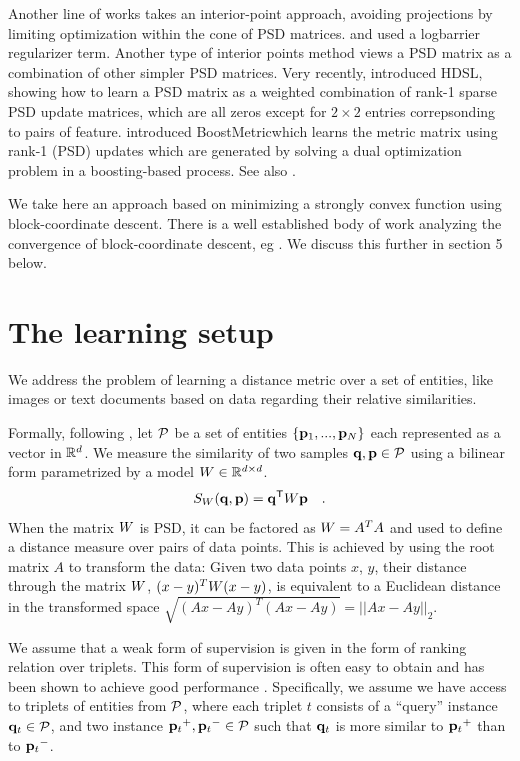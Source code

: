 \documentclass{article}
\begin{document}
Another line of works takes an interior-point approach, avoiding projections by limiting optimization within the cone of PSD matrices. \citet{davis2007information} and \citet{lego} used a logbarrier regularizer term. 
Another type of interior points method views a PSD matrix as a combination of other simpler PSD matrices. Very recently, \citet{hdsl} introduced HDSL, showing how to learn a PSD matrix as a weighted combination of rank-1 sparse PSD update matrices, which are all zeros except for $2\times2$ entries correpsonding to pairs of feature. \citet{boost} introduced BoostMetricwhich learns the metric matrix using rank-1 (PSD) updates which are generated by solving a dual optimization problem in a boosting-based process. See also \cite{bi2011adaboost}.

We take here an approach based on minimizing a strongly convex function using block-coordinate descent. There is a well established body of work analyzing the convergence of block-coordinate descent, eg \cite{nesterov2012efficiency,richtarik2014iteration}. We discuss this further in section 5 below.


\section{The learning setup}
We address the problem of learning a distance metric over a set of
entities, like images or text documents based on data regarding their
relative similarities.

Formally, following \cite{OASIS}, let $\cal{P}$ be a set of entities
$\{{\mathbf{p}}_1,...,{\mathbf{p}}_N\}$ each represented as a vector in $\mathbb{R}^d$.  We measure
the similarity of two samples ${\mathbf{q}}, {\mathbf{p}} \in \cal{P}$ using a bilinear
form parametrized by a model ${W} \in \mathbb{R}^{d \times d}$.
\begin{equation}
  S_{{W}}({\mathbf{q}}, {\mathbf{p}}) = {\mathbf{q}}{}^\mathsf{T} {W} {\mathbf{p}} \quad.
\end{equation}
When the matrix ${W}$ is PSD, it can be factored as ${W} = A^TA$ and used to define a distance measure over pairs of data points. This is achieved by using the root matrix $A$ to transform the data: Given two data points $x$, $y$, their distance through the matrix ${W}$, $(x-y)^T{W}(x-y)$, is equivalent to a Euclidean distance in the transformed space  $\sqrt{(Ax-Ay)^T(Ax-Ay)} = ||Ax-Ay||_2$. 

We assume that a weak form of supervision is given in the form of
ranking relation over triplets. This form of supervision is often easy
to obtain and has been shown to achieve good performance
\cite{weinberger2006dml,OASIS,qian}. Specifically, we assume we have access to
triplets of entities from $\cal{P}$, where each triplet $t$ consists of
a ``query'' instance ${{\mathbf{q}}_{{t}}} \in \cal{P}$, and two instance ${{\mathbf{p}}_{{t}}}^{+}, {{\mathbf{p}}_{{t}}}^{-} \in \cal{P}$ such that ${{\mathbf{q}}_{{t}}}$ is more similar to ${{\mathbf{p}}_{{t}}}^{+}$
than to ${{\mathbf{p}}_{{t}}}^{-}$.
\end{document}
